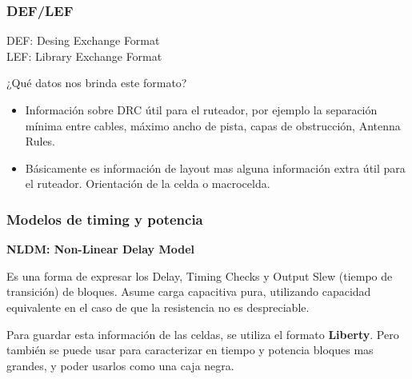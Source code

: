 \documentclass{beamer}
\begin{document}

\begin{frame}
\frametitle{DEF/LEF}
DEF: Desing Exchange Format \\
LEF: Library Exchange Format \\

\begin{center}¿Qué datos nos brinda este formato?
\end{center}
    \begin{itemize}
    \item Informaci\'on sobre DRC \'util para el ruteador, por ejemplo la separación mínima entre cables, m\'aximo ancho de pista, capas de obstrucción, Antenna Rules.
    \item B\'asicamente es informaci\'on de layout mas alguna informaci\'on extra \'util para el ruteador. Orientaci\'on de la celda o macrocelda.  
    \end{itemize}
\end{frame}

\begin{frame}
  \frametitle{Modelos de timing y potencia} 

\textbf{NLDM: Non-Linear Delay Model} 

Es una forma de expresar los Delay, Timing Checks y Output Slew (tiempo de transici\'on) de bloques. Asume carga capacitiva pura, utilizando capacidad equivalente en el caso de que la resistencia no es despreciable. 

Para guardar esta información de las celdas, se utiliza el formato \textbf{Liberty}. Pero también se puede usar para caracterizar en tiempo y potencia bloques mas grandes, y poder usarlos como una caja negra.
\end{frame}
\end{document}
